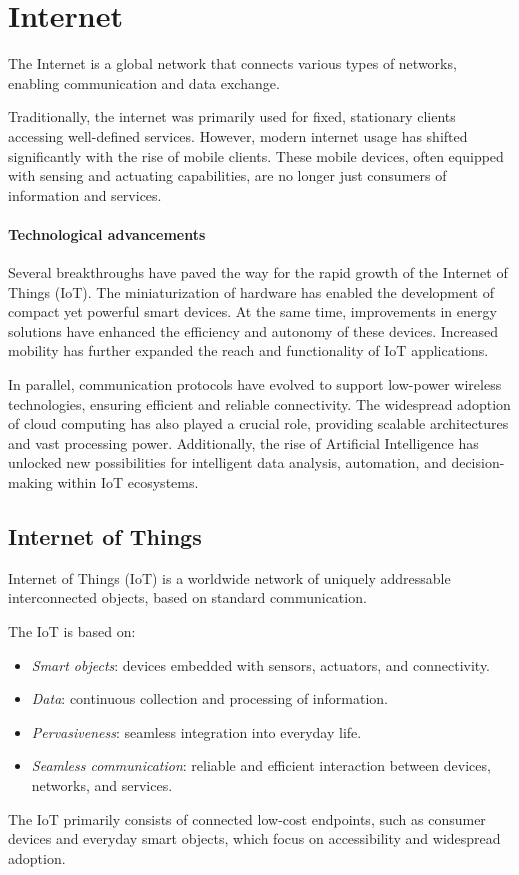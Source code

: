 \section{Internet}

\begin{definition}
    The Internet is a global network that connects various types of networks, enabling communication and data exchange.
\end{definition}
Traditionally, the internet was primarily used for fixed, stationary clients accessing well-defined services. 
However, modern internet usage has shifted significantly with the rise of mobile clients. 
These mobile devices, often equipped with sensing and actuating capabilities, are no longer just consumers of information and services.

\paragraph*{Technological advancements}
Several breakthroughs have paved the way for the rapid growth of the Internet of Things (IoT). 
The miniaturization of hardware has enabled the development of compact yet powerful smart devices. 
At the same time, improvements in energy solutions have enhanced the efficiency and autonomy of these devices. 
Increased mobility has further expanded the reach and functionality of IoT applications.

In parallel, communication protocols have evolved to support low-power wireless technologies, ensuring efficient and reliable connectivity. 
The widespread adoption of cloud computing has also played a crucial role, providing scalable architectures and vast processing power. 
Additionally, the rise of Artificial Intelligence has unlocked new possibilities for intelligent data analysis, automation, and decision-making within IoT ecosystems.

\subsection{Internet of Things}
\begin{definition}
    Internet of Things (IoT) is a worldwide network of uniquely addressable interconnected objects, based on standard communication.
\end{definition}
\noindent The IoT is based on: 
\begin{itemize}
    \item \textit{Smart objects}: devices embedded with sensors, actuators, and connectivity.
    \item \textit{Data}: continuous collection and processing of information.
    \item \textit{Pervasiveness}: seamless integration into everyday life.
    \item \textit{Seamless communication}: reliable and efficient interaction between devices, networks, and services.
\end{itemize}
\noindent The IoT primarily consists of connected low-cost endpoints, such as consumer devices and everyday smart objects, which focus on accessibility and widespread adoption.

